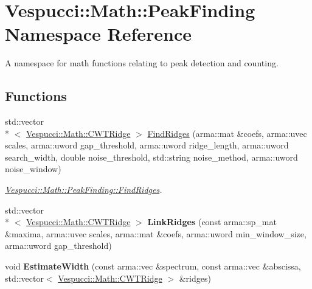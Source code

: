 \hypertarget{namespace_vespucci_1_1_math_1_1_peak_finding}{\section{Vespucci\+:\+:Math\+:\+:Peak\+Finding Namespace Reference}
\label{namespace_vespucci_1_1_math_1_1_peak_finding}
}


A namespace for math functions relating to peak detection and counting.  


\subsection*{Functions}
\begin{DoxyCompactItemize}
\item 
std\+::vector\\*
$<$ \hyperlink{class_vespucci_1_1_math_1_1_c_w_t_ridge}{Vespucci\+::\+Math\+::\+C\+W\+T\+Ridge} $>$ \hyperlink{namespace_vespucci_1_1_math_1_1_peak_finding_aede120546d4e46e4073058508fdd7ae9}{Find\+Ridges} (arma\+::mat \&coefs, arma\+::uvec scales, arma\+::uword gap\+\_\+threshold, arma\+::uword ridge\+\_\+length, arma\+::uword search\+\_\+width, double noise\+\_\+threshold, std\+::string noise\+\_\+method, arma\+::uword noise\+\_\+window)
\begin{DoxyCompactList}\small\item\em \hyperlink{namespace_vespucci_1_1_math_1_1_peak_finding_aede120546d4e46e4073058508fdd7ae9}{Vespucci\+::\+Math\+::\+Peak\+Finding\+::\+Find\+Ridges}. \end{DoxyCompactList}\item 
\hypertarget{namespace_vespucci_1_1_math_1_1_peak_finding_a436ae6b6b68db30f0502e852999077cc}{std\+::vector\\*
$<$ \hyperlink{class_vespucci_1_1_math_1_1_c_w_t_ridge}{Vespucci\+::\+Math\+::\+C\+W\+T\+Ridge} $>$ {\bfseries Link\+Ridges} (const arma\+::sp\+\_\+mat \&maxima, arma\+::uvec scales, arma\+::mat \&coefs, arma\+::uword min\+\_\+window\+\_\+size, arma\+::uword gap\+\_\+threshold)}\label{namespace_vespucci_1_1_math_1_1_peak_finding_a436ae6b6b68db30f0502e852999077cc}

\item 
\hypertarget{namespace_vespucci_1_1_math_1_1_peak_finding_acbebf6b4e4354d20a048d52eb54e6db4}{void {\bfseries Estimate\+Width} (const arma\+::vec \&spectrum, const arma\+::vec \&abscissa, std\+::vector$<$ \hyperlink{class_vespucci_1_1_math_1_1_c_w_t_ridge}{Vespucci\+::\+Math\+::\+C\+W\+T\+Ridge} $>$ \&ridges)}\label{namespace_vespucci_1_1_math_1_1_peak_finding_acbebf6b4e4354d20a048d52eb54e6db4}


\end{DoxyCompactItemize}
